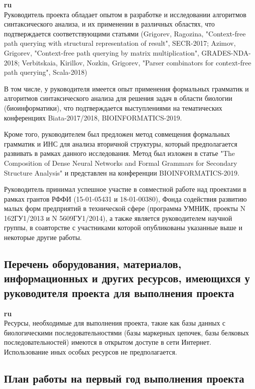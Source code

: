 \documentclass[12pt]{article}  %
\theoremstyle{remark}
\begin{document}
\textbf{ru}\\
Руководитель проекта обладает опытом в разработке и исследовании алгоритмов синтаксического анализа, и их применении в различных областях, что подтверждается соответствующими статьями (Grigorev, Ragozina, "Context-free path querying with structural representation of result", SECR-2017; Azimov, Grigorev, "Context-free path querying by matrix multiplication", GRADES-NDA-2018; Verbitskaia, Kirillov, Nozkin, Grigorev, "Parser combinators for context-free path querying", Scala-2018)

В том числе, у руководителя имеется опыт применения формальных грамматик и алгоритмов синтаксического анализа для решения задач в области биологии (биоинформатики), что подтверждается выступлениями на тематических конференциях Biata-2017/2018, BIOINFORMATICS-2019.

Кроме того, руководителем был предложен метод совмещения формальных грамматик и ИНС для анализа вторичной структуры, который предполагается развивать в рамках данного исследования. Метод был изложен в статье "The Composition of Dense Neural Networks and Formal Grammars for Secondary Structure Analysis" и представлен на конференции BIOINFORMATICS-2019.

Руководитель принимал успешное участие в совместной работе над проектами в рамках грантов РФФИ (15-01-05431 и 18-01-00380), Фонда содействия развитию малых форм предприятий в технической сфере
(программа УМНИК, проекты N 162ГУ1/2013 и N 5609ГУ1/2014), а также является руководителем научной группы, в соавторстве с участниками которой опубликованы указанные выше и некоторые другие работы.

\subsection{Перечень оборудования, материалов, информационных и других ресурсов, имеющихся у руководителя проекта для выполнения проекта }
\textbf{ru}\\
Ресурсы, необходимые для выполнения проекта, такие как базы данных с биологическими последовательностями (базы маркерных цепочек, базы белковых последовательностей) имеются в открытом доступе в сети Интернет.
Использование иных особых ресурсов не предполагается.


\subsection{План работы на первый год выполнения проекта}
\end{document}
